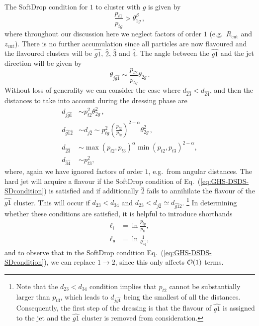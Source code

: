 \documentclass[nofootinbib,twocolumn,preprintnumbers,superscriptaddress,aps]{revtex4-2}
\newcommand{\order}[1]{{\cal O}\!\left(#1\right)}
\begin{document}
The SoftDrop condition for $1$ to cluster with $g$ is given by
\begin{equation}
  \label{eq:GHS-DSDS-SDcondition}
  \frac{p_{t1}}{p_{tg}} > \theta_{1g}^{\beta}\,,
\end{equation}
where throughout our discussion here we neglect factors of order $1$
(e.g.\ $R_\text{cut}$ and $z_\text{cut}$).
%
There is no further accumulation since all particles are now flavoured
and the flavoured clusters will be $\widehat{g1}$, $\hat{2}$,
$\hat{3}$ and $\hat{4}$.
%
The angle between the $\widehat{g1}$ and the jet direction will be
given by
\begin{equation}
  \label{eq:eq:GHS-DSDS-theta-j-g1}
  \theta_{j\widehat{g1}} \sim \frac{p_{t2}}{p_{tg}} \theta_{2g}\,.
\end{equation}
%
Without loss of generality we can consider the case where
$d_{\hat{2}\hat{3}} < d_{\hat{2}\hat{4}}$, and then the distances to
take into account during the dressing phase are 
\begin{subequations}
  \label{eq:eq:GHS-DSDS-annihilation-conditions}
  \begin{align}
    d_{j\widehat{g1}} &\sim p_{t2}^2 \theta_{2g}^2\,,
    \\
    d_{\widehat{g1}\hat 2}
                      &
                        \sim d_{j\hat 2}
                        \sim p_{tg}^2 \left(\frac{p_{t2}}{p_{tg}}\right)^{2-\alpha} \theta_{2g}^2\,,
    \\
    d_{\hat2\hat3}
                      &
                        \sim \max(p_{t2},p_{t3})^\alpha \min(p_{t2},p_{t3})^{2-\alpha},
    \\
    d_{\hat3\hat4}
                      &
                        \sim p_{t3}^2,
  \end{align}
\end{subequations}
where, again we have ignored factors of order $1$, e.g.\ from angular
distances. 
%
The hard jet will acquire a flavour if the SoftDrop condition
of Eq.~(\ref{eq:GHS-DSDS-SDcondition}) is satisfied and if additionally
$\hat 2$ fails to annihilate the flavour of the $\widehat{g1}$
cluster.
%
This will occur if $d_{23} < d_{34}$ and
$d_{23} < d_{j\hat 2}\simeq d_{\widehat{g1} 2}$.%
\footnote{ Note that the $d_{23} < d_{34}$ condition implies that
  $p_{t2}$ cannot be substantially larger than $p_{t3}$,
  which leads to $ d_{j\widehat{g1}}$ being the
  smallest of all the distances.
  Consequently, the first step of the dressing is that the flavour of
  $\widehat{g1}$ is assigned to the jet and the $\widehat{g1}$ cluster
  is removed from consideration.  }
%
In determining whether these conditions are satisfied, it is helpful
to introduce shorthands
\begin{subequations}
  \begin{align}
    \ell_i &= \ln \frac{p_{tg}}{p_{ti}}, \\
    \ell_\theta &= \ln \frac{1}{\theta_{2g}},
  \end{align}
\end{subequations}
and to observe that in the SoftDrop condition
Eq.~(\ref{eq:GHS-DSDS-SDcondition}), we can replace $1 \to 2$, since
this only affects $\order{1}$ terms.
\end{document}
